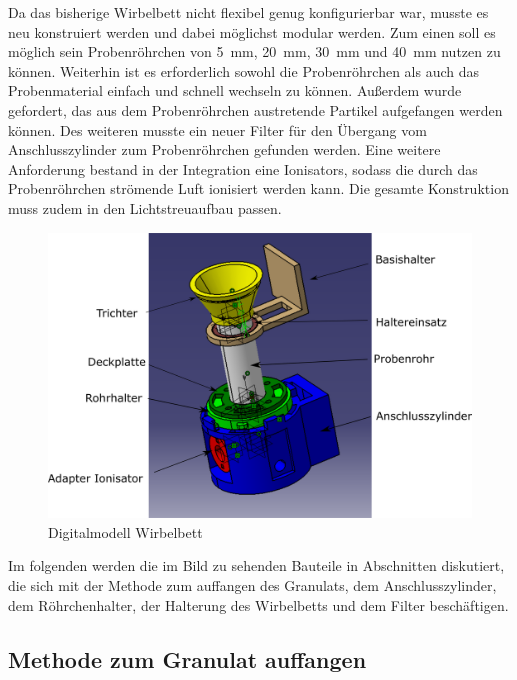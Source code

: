 Da das bisherige Wirbelbett nicht flexibel genug konfigurierbar war, musste es neu konstruiert werden und dabei möglichst modular werden. Zum einen soll es möglich sein Probenröhrchen von \SI{5}{mm}, \SI{20}{mm}, \SI{30}{mm} und \SI{40}{mm} nutzen zu können. Weiterhin ist es erforderlich sowohl die Probenröhrchen als auch das Probenmaterial einfach und schnell wechseln zu können. Außerdem wurde gefordert, das aus dem Probenröhrchen austretende Partikel aufgefangen werden können. Des weiteren musste ein neuer Filter für den Übergang vom Anschlusszylinder zum Probenröhrchen gefunden werden. 
Eine weitere Anforderung bestand in der Integration eine Ionisators, sodass die durch das Probenröhrchen strömende Luft ionisiert werden kann. Die gesamte Konstruktion muss zudem in den Lichtstreuaufbau passen. \\




\begin{figure}[h]
	\begin{center}
		\includegraphics[scale=0.6]{Zusammenbau_fluides_Bett.png}
		\caption{Digitalmodell Wirbelbett}
	\end{center}
\end{figure}


Im folgenden werden die im Bild zu sehenden Bauteile in Abschnitten diskutiert, die sich mit der Methode zum auffangen des Granulats, dem Anschlusszylinder, dem Röhrchenhalter, der Halterung des Wirbelbetts und dem Filter beschäftigen.


\subsection{Methode zum Granulat auffangen}


